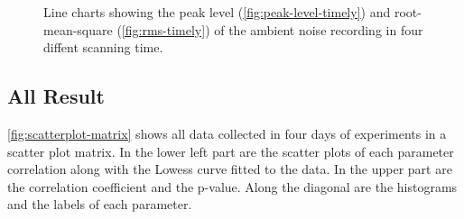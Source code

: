 	\begin{figure}[h]
		\begin{adjustwidth}{-1cm}{}
		\caption[Ambient noise in different scanning time.]
		{Line charts showing the peak level (\ref{fig:peak-level-timely}) and root-mean-square (\ref{fig:rms-timely}) of the ambient noise recording in four diffent scanning time.}
		\label{fig:audio-result-timely}
		\end{adjustwidth}
	\end{figure}



	\subsection{All Result} %
	\label{sub:all_result}
	\autoref{fig:scatterplot-matrix} shows all data collected in four days of experiments in a scatter plot matrix. In the lower left part are the scatter plots of each parameter correlation along with the Lowess curve fitted to the data. In the upper part are the correlation coefficient and the p-value. Along the diagonal are the histograms and the labels of each parameter.

